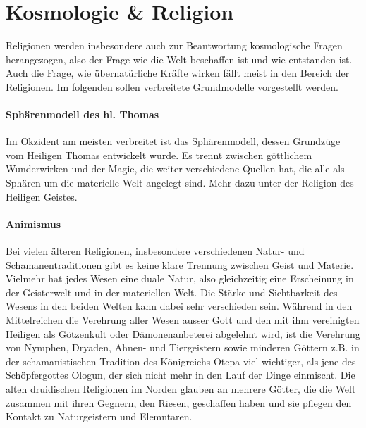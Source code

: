 \documentclass[10pt,twoside,twocolumn,openany]{book}
\begin{document}
\chapter{Kosmologie \& Religion}
\begin{multicols}{2}
	Religionen werden insbesondere auch zur Beantwortung kosmologische Fragen herangezogen, also der Frage wie die Welt beschaffen ist und wie entstanden ist. Auch die Frage, wie übernatürliche Kräfte wirken fällt meist in den Bereich der Religionen.
	Im folgenden sollen verbreitete Grundmodelle vorgestellt werden.
	
	\subsubsection{Sphärenmodell des hl. Thomas}
	Im Okzident am meisten verbreitet ist das Sphärenmodell, dessen Grundzüge vom Heiligen Thomas entwickelt wurde. Es trennt zwischen göttlichem Wunderwirken und der Magie, die weiter verschiedene Quellen hat, die alle als Sphären um die materielle Welt angelegt sind. Mehr dazu unter der Religion des Heiligen Geistes.
	
	\subsubsection{Animismus}
	Bei vielen älteren Religionen, insbesondere verschiedenen Natur- und Schamanentraditionen gibt es keine klare Trennung zwischen Geist und Materie. Vielmehr hat jedes Wesen eine duale Natur, also gleichzeitig eine Erscheinung in der Geisterwelt und in der materiellen Welt. Die Stärke und Sichtbarkeit des Wesens in den beiden Welten kann dabei sehr verschieden sein. Während in den Mittelreichen die Verehrung aller Wesen ausser Gott und den mit ihm vereinigten Heiligen als Götzenkult oder Dämonenanbeterei abgelehnt wird, ist die Verehrung von Nymphen, Dryaden, Ahnen- und Tiergeistern sowie minderen Göttern z.B. in der schamanistischen Tradition des Königreichs Otepa viel wichtiger, als jene des Schöpfergottes Ologun, der sich nicht mehr in den Lauf der Dinge einmischt. Die alten druidischen Religionen im Norden glauben an mehrere Götter, die die Welt zusammen mit ihren Gegnern, den Riesen, geschaffen haben und sie pflegen den Kontakt zu Naturgeistern und Elemntaren.

	
	
\end{multicols}
\end{document}
